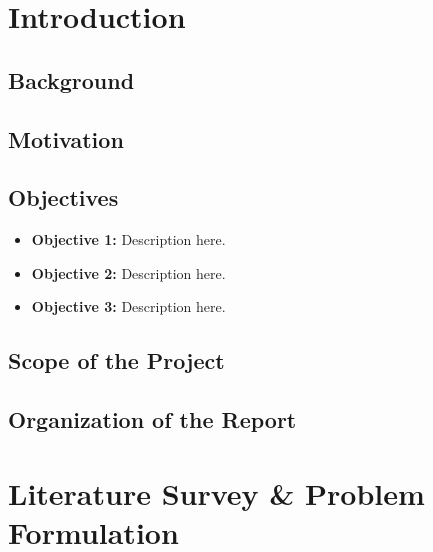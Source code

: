 \documentclass[12pt,a4paper]{report}
\numberwithin{equation}{chapter}
\begin{document}
\newpage
{}
\setcounter{page}{1}
\pagestyle{fancy}

\chapter{Introduction}
\label{ch:introduction}


\section{Background}

\section{Motivation}

\section{Objectives}
\begin{itemize}[leftmargin=*]
  \item \textbf{Objective 1:} Description here.
  \item \textbf{Objective 2:} Description here.
  \item \textbf{Objective 3:} Description here.
\end{itemize}

\section{Scope of the Project}

\section{Organization of the Report}

\chapter{Literature Survey \& Problem Formulation}
\label{ch:literature}
\end{document}
